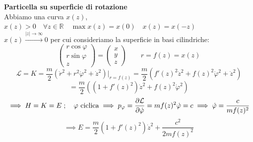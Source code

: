 \begin{example}
    \textbf{Particella su superficie di rotazione}\\
    Abbiamo una curva $x(z)$, $x(z) > 0 \quad \forall z \in \mathbb{R} \quad \max x(z) = x(0) \quad x(z) = x(-z) $\\ 
    $ x(z) \xrightarrow{|z|\to \infty} 0$ per cui consideriamo la superficie in basi cilindriche:
    \begin{equation*}
        \begin{pmatrix}
            r\cos\varphi\\
            r\sin\varphi\\
            z
        \end{pmatrix}
        =
        \begin{pmatrix}
            x\\y\\z
        \end{pmatrix}
        \qquad r = f(z) = x(z)
    \end{equation*}
    \begin{equation*}
        \mathcal{L} = K = \frac{m}{2} \left( \dot{r}^2 + r^2 \dot{\varphi}^2 + \dot{z}^2 \right)\bigg|_{r = f(z)} =
        \frac{m}{2} \left( f'(z)^2 \dot{z}^2 + f(z)^2 \dot{\varphi}^2 + \dot{z}^2 \right)
    \end{equation*}
    \begin{equation}
        = \frac{m}{2} \left( \left(1 + f'(z)^2 \right) \dot{z}^2 + f(z)^2 \dot{\varphi}^2 \right)
    \end{equation}
    \begin{equation}
        \implies H = K = E \;;\quad \varphi \text{ ciclica} \implies p_\varphi = \pdv{\mathcal{L}}{\dot{\varphi}} = mf(z)^2 \dot{\varphi} = c 
        \implies \dot{\varphi} = \frac{c}{m f(z)^2}
    \end{equation}
    \begin{equation}
        \implies E = \frac{m}{2} \left( 1 + f'(z)^2 \right) \dot{z}^2 + \frac{c^2}{2m f(z)^2}
    \end{equation}


\end{example}


